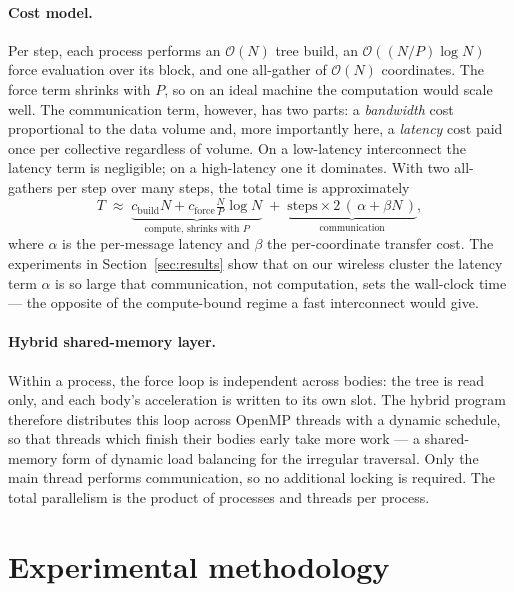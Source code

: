 \documentclass[11pt,a4paper]{article}
\begin{document}
\paragraph{Cost model.}
Per step, each process performs an $\mathcal{O}(N)$ tree build, an
$\mathcal{O}((N/P)\log N)$ force evaluation over its block, and one all-gather of
$\mathcal{O}(N)$ coordinates. The force term shrinks with $P$, so on an ideal
machine the computation would scale well. The communication term, however, has two
parts: a \emph{bandwidth} cost proportional to the data volume and, more
importantly here, a \emph{latency} cost paid once per collective regardless of
volume. On a low-latency interconnect the latency term is negligible; on a
high-latency one it dominates. With two all-gathers per step over many steps, the
total time is approximately
\[
T \;\approx\; \underbrace{c_{\text{build}}N + c_{\text{force}}\tfrac{N}{P}\log N}_{\text{compute, shrinks with }P}
   \;+\; \underbrace{\text{steps}\times 2\,(\,\alpha + \beta N\,)}_{\text{communication}},
\]
where $\alpha$ is the per-message latency and $\beta$ the per-coordinate transfer
cost. The experiments in Section~\ref{sec:results} show that on our wireless
cluster the latency term $\alpha$ is so large that communication, not computation,
sets the wall-clock time --- the opposite of the compute-bound regime a fast
interconnect would give.

\paragraph{Hybrid shared-memory layer.}
Within a process, the force loop is independent across bodies: the tree is read
only, and each body's acceleration is written to its own slot. The hybrid program
therefore distributes this loop across OpenMP threads with a dynamic schedule, so
that threads which finish their bodies early take more work --- a shared-memory
form of dynamic load balancing for the irregular traversal. Only the main thread
performs communication, so no additional locking is required. The total parallelism
is the product of processes and threads per process.

\section{Experimental methodology}
\label{sec:method}
\end{document}

